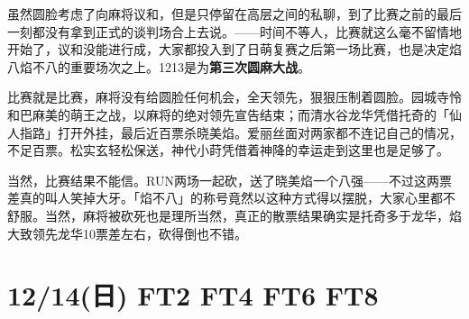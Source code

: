 
虽然圆脸考虑了向麻将议和，但是只停留在高层之间的私聊，到了比赛之前的最后一刻都没有拿到正式的谈判场合上去说。——时间不等人，比赛就这么毫不留情地开始了，议和没能进行成，大家都投入到了日萌复赛之后第一场比赛，也是决定焰八焰不八的重要场次之上。1213是为\textbf{第三次圆麻大战}。

比赛就是比赛，麻将没有给圆脸任何机会，全天领先，狠狠压制着圆脸。园城寺怜和巴麻美的萌王之战，以麻将的绝对领先宣告结束；而清水谷龙华凭借托奇的「仙人指路」打开外挂，最后近百票杀晓美焰。爱丽丝面对两家都不连记自己的情况，不足百票。松实玄轻松保送，神代小莳凭借着神降的幸运走到这里也是足够了。

当然，比赛结果不能信。RUN两场一起砍，送了晓美焰一个八强——不过这两票差真的叫人笑掉大牙。「焰不八」的称号竟然以这种方式得以摆脱，大家心里都不舒服。当然，麻将被砍死也是理所当然，真正的散票结果确实是托奇多于龙华，焰大致领先龙华10票差左右，砍得倒也不错。

\section{12/14(日) FT2 FT4 FT6 FT8}


